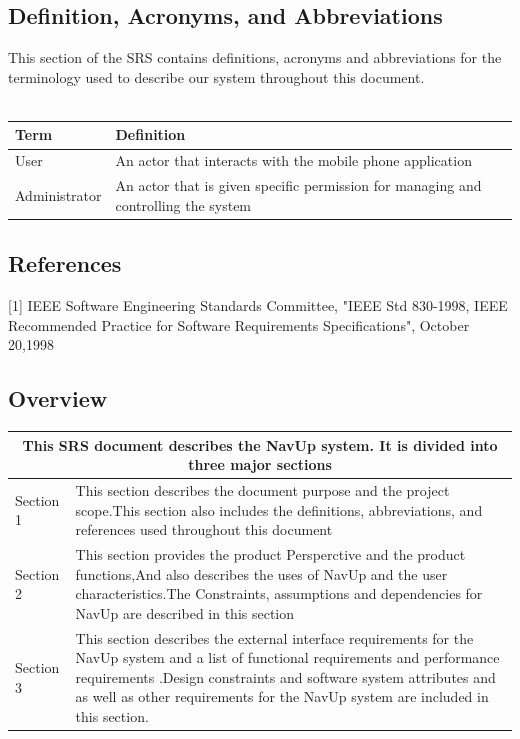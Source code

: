 \documentclass[english]{article}
\begin{document}
		\subsection{Definition, Acronyms, and Abbreviations}
				This section of the SRS contains definitions, acronyms and abbreviations for the terminology used to describe our system throughout this document.
				\\
				\\
				\begin{tabular}{ |p{3cm}|p{9cm}|  }
				\hline
				\textbf{Term} & \textbf{Definition}\\
				\hline
				User & An actor that interacts with the mobile phone application \\
				\hline
				Administrator & An actor that is given specific permission for managing and controlling the system\\
				\hline
				\end{tabular}

		\subsection{References}
			[1] IEEE Software Engineering Standards Committee, "IEEE Std 830-1998, IEEE Recommended Practice for Software Requirements Specifications", October 20,1998

		\subsection{Overview}
				\begin{tabular}{ |p{3cm}||p{11cm}|  }
				\hline
				\multicolumn{2}{|c|}{This SRS document describes the NavUp system. It is divided into three major sections} \\
				\hline
				Section 1 & This section describes the document purpose and the project scope.This section also includes the definitions, abbreviations, and references used throughout this document \\
				\hline
				Section 2 & This section provides the product Persperctive and the product functions,And also describes the uses of NavUp and the user characteristics.The Constraints, assumptions and dependencies for NavUp are described in this section\\
				\hline
				Section 3 & This section describes the external interface requirements for the NavUp system and a list of functional requirements and performance requirements .Design constraints and software system attributes and as well as other requirements for the NavUp system are included in this section.\\
				\hline
				\end{tabular}
	\newpage
\end{document}
